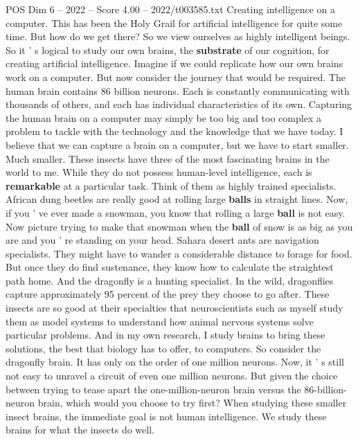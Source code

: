 \begin{textsample}{POS Dim 6 – 2022 – Score 4.00 – 2022/t003585.txt}  \label{ex:f6_pos_069}
Creating intelligence on a computer.
This has been the Holy Grail for artificial intelligence for quite some time.
But how do we get there?
So we view ourselves as highly intelligent beings.
So it ' s logical to study our own brains, the \textbf{substrate} of our cognition, for creating artificial intelligence.
Imagine if we could replicate how our own brains work on a computer.
But now consider the journey that would be required.
The human brain contains 86 billion neurons.
Each is constantly communicating with thousands of others, and each has individual characteristics of its own.
Capturing the human brain on a computer may simply be too big and too complex a problem to tackle with the technology and the knowledge that we have today.
I believe that we can capture a brain on a computer, but we have to start smaller.
Much smaller.
These insects have three of the most fascinating brains in the world to me.
While they do not possess human-level intelligence, each is \textbf{remarkable} at a particular task.
Think of them as highly trained specialists.
African dung beetles are really good at rolling large \textbf{balls} in straight lines.
Now, if you ' ve ever made a snowman, you know that rolling a large \textbf{ball} is not easy.
Now picture trying to make that snowman when the \textbf{ball} of snow is as big as you are and you ' re standing on your head.
Sahara desert ants are navigation specialists.
They might have to wander a considerable distance to forage for food.
But once they do find sustenance, they know how to calculate the straightest path home.
And the dragonfly is a hunting specialist.
In the wild, dragonflies capture approximately 95 percent of the prey they choose to go after.
These insects are so good at their specialties that neuroscientists such as myself study them as model systems to understand how animal nervous systems solve particular problems.
And in my own research, I study brains to bring these solutions, the best that biology has to offer, to computers.
So consider the dragonfly brain.
It has only on the order of one million neurons.
Now, it ' s still not easy to unravel a circuit of even one million neurons.
But given the choice between trying to tease apart the one-million-neuron brain versus the 86-billion-neuron brain, which would you choose to try first?
When studying these smaller insect brains, the immediate goal is not human intelligence.
We study these brains for what the insects do well.

\end{textsample}
